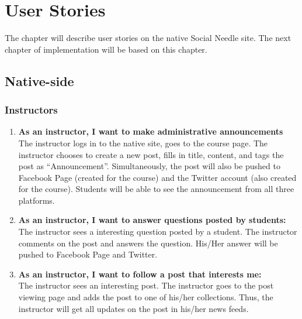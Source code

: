 
%
%

\chapter{User Stories}
The chapter will describe user stories on the native Social Needle site. The next chapter of implementation will be based on this chapter. 

\section{Native-side}
\subsection{Instructors}
\begin{enumerate}
	\item \textbf{As an instructor, I want to make administrative announcements} \\
	The instructor logs in to the native site, goes to the course page. The instructor chooses to create a new post, fills in title, content, and tags the post as ``Announcement''. Simultaneously, the post will also be pushed to Facebook Page (created for the course) and the Twitter account (also created for the course). Students will be able to see the announcement from all three platforms.  
	
	\item \textbf{As an instructor, I want to answer questions posted by students:} \\
	The instructor sees a interesting question posted by a student. The instructor comments on the post and answers the question. His/Her answer will be pushed to Facebook Page and Twitter.
	 
	\item \textbf{As an instructor, I want to follow a post that interests me:} \\
	The instructor sees an interesting post. The instructor goes to the post viewing page and adds the post to one of his/her collections. Thus, the instructor will get all updates on the post in his/her news feeds.
\end{enumerate}

